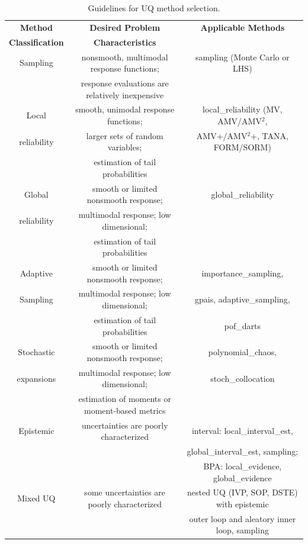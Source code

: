 \begin{table}[hbp]
\centering
\caption{Guidelines for UQ method selection.} \label{usage:guideuq}\vspace{2mm}
\begin{tabular}{|c|c|c|}
\hline
\textbf{Method} & \textbf{Desired Problem} & \textbf{Applicable Methods} \\
\textbf{Classification} & \textbf{Characteristics} & \\
\hline
Sampling & nonsmooth, multimodal response functions;       & sampling 
(Monte Carlo or LHS) \\
         & response evaluations are relatively inexpensive & \\
\hline
Local       & smooth, unimodal response functions; & local\_reliability
(MV, AMV/AMV$^2$,\\
reliability & larger sets of random variables;     & AMV+/AMV$^2$+, TANA, 
FORM/SORM) \\
            & estimation of tail probabilities     & \\
\hline
Global      & smooth or limited nonsmooth response; & global\_reliability \\
reliability & multimodal response; low dimensional; & \\
            & estimation of tail probabilities      & \\
\hline
Adaptive    & smooth or limited nonsmooth response; & importance\_sampling, \\
Sampling    & multimodal response; low dimensional; & gpais, adaptive\_sampling, \\
            & estimation of tail probabilities      & pof\_darts \\
\hline
Stochastic & smooth or limited nonsmooth response; & polynomial\_chaos, \\
expansions & multimodal response; low dimensional; & stoch\_collocation\\
           & estimation of moments or moment-based metrics & \\
\hline
Epistemic & uncertainties are poorly characterized &
interval: local\_interval\_est, \\
 & & global\_interval\_est, sampling; \\
 & & BPA: local\_evidence, global\_evidence \\
\hline
Mixed UQ  & some uncertainties are poorly characterized &
nested UQ (IVP, SOP, DSTE) with epistemic \\
 & & outer loop and aleatory inner loop, sampling \\
\hline
\end{tabular}
\end{table}


